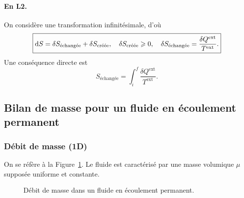             \paragraph{En L2.}
                On considère une transformation infinitésimale, d'où
                \begin{equation}
                    \boxed{
                        \mathrm{d} S=\delta S_{\text{échangée}}+\delta S_{\text{créée}},\quad\delta S_{\text{créée}}\geqslant0,\quad\delta S_{\text{échangée}}=\frac{\delta Q^{\text{ext}}}{T^{\text{ext}}}.
                    }
                \end{equation}
                Une conséquence directe est 
                \begin{equation}
                    S_{\text{échangée}}=\int_{i}^{f}\frac{\delta Q^{\text{ext}}}{T^{\text{ext}}}.
                \end{equation}

    \subsection{Bilan de masse pour un fluide en écoulement permanent}
        \subsubsection{Débit de masse (1D)}

            On se réfère à la Figure~\ref{fig:debit_masse_fluide_ecoulement_permanent}. Le fluide est caractérisé par une masse volumique $\mu$ supposée uniforme et constante.

            \begin{figure}
                \centering
                \caption{Débit de masse dans un fluide en écoulement permanent.}    
                \label{fig:debit_masse_fluide_ecoulement_permanent}
            \end{figure}

